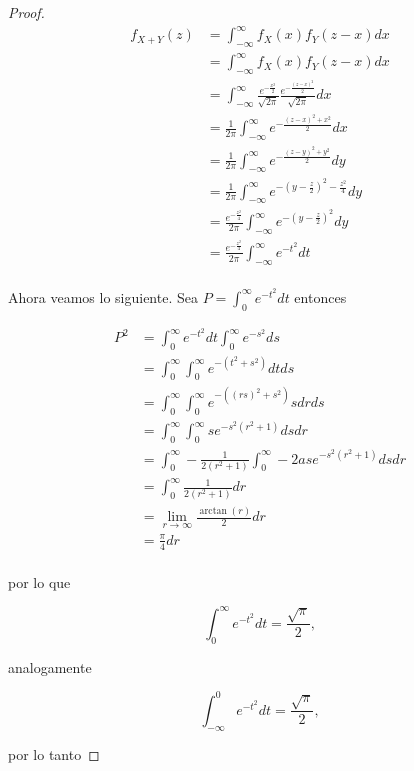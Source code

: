 \documentclass[letterpaper]{article}
\theoremstyle{definition}
\theoremstyle{lemathm}
\theoremstyle{lemademthm}
\begin{document}
\begin{enumerate}
\begin{enumerate}
\begin{proof}
				\begin{align*}
					f_{X+Y}(z) &= \int_{-\infty}^{\infty} f_X(x)f_Y(z-x)dx\\
					&= \int_{-\infty}^{\infty} f_X(x)f_Y(z-x)dx\\
					&= \int_{-\infty}^{\infty} \frac{e^{-\frac{x^2}{2}}}{\sqrt{2\pi}} \frac{e^{-\frac{(z-x)^2}{2}}}{\sqrt{2\pi}} dx\\
					&= \frac{1}{2\pi} \int_{-\infty}^{\infty} e^{-\frac{(z-x)^2 + x^2}{2}} dx\\
					&= \frac{1}{2\pi} \int_{-\infty}^{\infty} e^{-\frac{(z-y)^2 + y^2}{2}} dy\\
					&= \frac{1}{2\pi} \int_{-\infty}^{\infty} e^{-(y-\frac{z}{2})^2 - \frac{z^2}{4}} dy\\
					&= \frac{e^{-\frac{z^2}{4}}}{2\pi} \int_{-\infty}^{\infty} e^{-(y-\frac{z}{2})^2} dy\\
					&= \frac{e^{-\frac{z^2}{4}}}{2\pi} \int_{-\infty}^{\infty} e^{-t^2} dt\\
				\end{align*}

				Ahora veamos lo siguiente. Sea $P = \int_{0}^{\infty} e^{-t^2} dt$ entonces

				\begin{align*}
					P^2 &= \int_{0}^{\infty} e^{-t^2} dt \int_{0}^{\infty} e^{-s^2} ds\\
					&= \int_{0}^{\infty} \int_{0}^{\infty} e^{-(t^2+s^2)} dt ds\\
					&= \int_{0}^{\infty} \int_{0}^{\infty} e^{-((rs)^2+s^2)} s dr ds\\
					&= \int_{0}^{\infty} \int_{0}^{\infty} s e^{-s^2(r^2+1)}  ds dr\\
					&= \int_{0}^{\infty} -\frac{1}{2(r^2+1)} \int_{0}^{\infty} -2as e^{-s^2(r^2+1)}  ds dr\\
					&= \int_{0}^{\infty} \frac{1}{2(r^2+1)} dr\\
					&= \lim_{r \rightarrow \infty} \frac{\arctan(r)}{2} dr\\
					&= \frac{\pi}{4} dr\\
				\end{align*}

				por lo que

				\[\int_{0}^{\infty} e^{-t^2} dt = \frac{\sqrt{\pi}}{2},\]

				analogamente

				\[\int_{-\infty}^{0} e^{-t^2} dt = \frac{\sqrt{\pi}}{2},\]

				por lo tanto


\end{proof}
\end{enumerate}
\end{enumerate}
\end{document}

